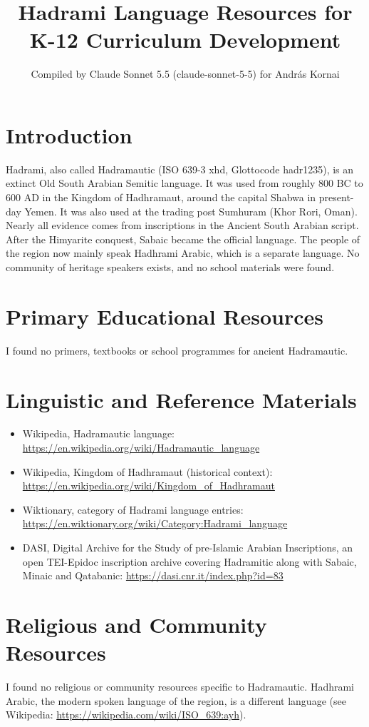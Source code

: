 \documentclass[12pt]{article}
\title{Hadrami Language Resources for K-12 Curriculum Development}
\author{Compiled by Claude Sonnet 5.5 (claude-sonnet-5-5) for Andr\'as Kornai}
\date{}
\begin{document}
\maketitle

\section{Introduction}
Hadrami, also called Hadramautic (ISO 639-3 xhd, Glottocode hadr1235), is an extinct Old South Arabian Semitic language. It was used from roughly 800 BC to 600 AD in the Kingdom of Hadhramaut, around the capital Shabwa in present-day Yemen. It was also used at the trading post Sumhuram (Khor Rori, Oman). Nearly all evidence comes from inscriptions in the Ancient South Arabian script. After the Himyarite conquest, Sabaic became the official language. The people of the region now mainly speak Hadhrami Arabic, which is a separate language. No community of heritage speakers exists, and no school materials were found.

\section{Primary Educational Resources}
I found no primers, textbooks or school programmes for ancient Hadramautic.

\section{Linguistic and Reference Materials}
\begin{itemize}
\item Wikipedia, Hadramautic language: \url{https://en.wikipedia.org/wiki/Hadramautic_language}
\item Wikipedia, Kingdom of Hadhramaut (historical context): \url{https://en.wikipedia.org/wiki/Kingdom_of_Hadhramaut}
\item Wiktionary, category of Hadrami language entries: \url{https://en.wiktionary.org/wiki/Category:Hadrami_language}
\item DASI, Digital Archive for the Study of pre-Islamic Arabian Inscriptions, an open TEI-Epidoc inscription archive covering Hadramitic along with Sabaic, Minaic and Qatabanic: \url{https://dasi.cnr.it/index.php?id=83}
\end{itemize}

\section{Religious and Community Resources}
I found no religious or community resources specific to Hadramautic. Hadhrami Arabic, the modern spoken language of the region, is a different language (see Wikipedia: \url{https://wikipedia.com/wiki/ISO_639:ayh}).
\end{document}
